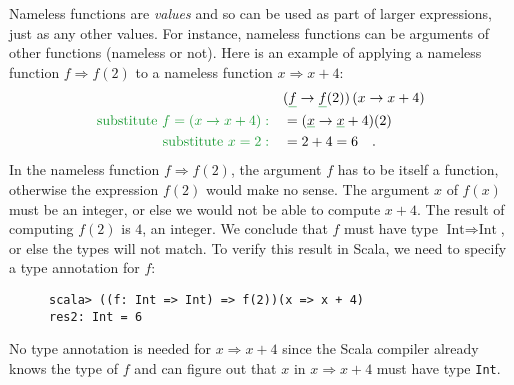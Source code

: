 Nameless functions are \emph{values} and so can be used as part of
larger expressions, just as any other values. For instance, nameless
functions can be arguments of other functions (nameless or not). Here
is an example of applying a nameless function $f\Rightarrow f(2)$
to a nameless function $x\Rightarrow x+4$:
\begin{align*}
 & (\gunderline f\Rightarrow\gunderline f(2))\left(x\Rightarrow x+4\right)\\
{\color{greenunder}\text{substitute }f=\left(x\Rightarrow x+4\right):}\quad & =(\gunderline x\Rightarrow\gunderline x+4)(2)\\
{\color{greenunder}\text{substitute }x=2:}\quad & =2+4=6\quad.
\end{align*}
In the nameless function $f\Rightarrow f(2)$, the argument $f$ has
to be itself a function, otherwise the expression $f(2)$ would make
no sense. The argument $x$ of $f(x)$ must be an integer, or else
we would not be able to compute $x+4$. The result of computing $f(2)$
is $4$, an integer. We conclude that $f$ must have type $\text{Int}\Rightarrow\text{Int}$,
or else the types will not match. To verify this result in Scala,
we need to specify a type annotation for $f$:

\begin{wrapfigure}{l}{0.46\columnwidth}%
\vspace{-0.75\baselineskip}
\begin{lstlisting}
scala> ((f: Int => Int) => f(2))(x => x + 4)
res2: Int = 6  
\end{lstlisting}
\vspace{-0.75\baselineskip}
\end{wrapfigure}%

\noindent No type annotation is needed for $x\Rightarrow x+4$ since
the Scala compiler already knows the type of $f$ and can figure out
that $x$ in $x\Rightarrow x+4$ must have type \lstinline!Int!.

